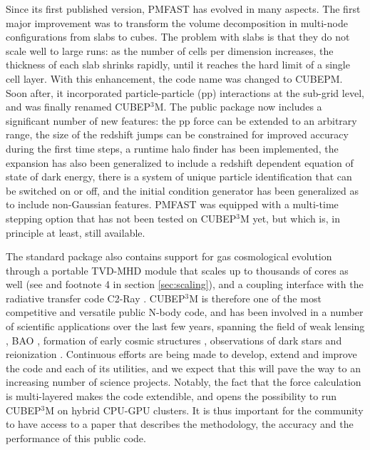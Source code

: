 \documentclass[useAMS,usenatbib]{mn2e}
\begin{document}
Since its first published version, {\small PMFAST} has evolved in many aspects. 
The first major improvement was to transform the volume decomposition in multi-node configurations 
from slabs to cubes. The problem with slabs is that they do not scale well to large runs: 
as the number of cells per dimension increases, the thickness of each slab shrinks rapidly,
until it reaches the hard limit of a single cell layer.  With this enhancement, the code name was changed to {\small CUBEPM}. Soon after, it incorporated particle-particle (pp) interactions at the sub-grid level, 
and was finally renamed {\small CUBEP$^3$M}. The public package now includes a significant number of new features: the pp force
can be extended to an arbitrary range, the size of the redshift jumps can be constrained for improved accuracy during the first time steps,
a runtime halo finder has been implemented, the expansion has also been generalized to include a redshift dependent equation of state of dark energy, there is a system of unique particle identification that can be switched on or off, and the initial condition generator has been generalized as to include non-Gaussian features.
 {\small PMFAST} was equipped with a multi-time stepping option that has not been tested on {\small CUBEP$^3$M} yet, but which is, in principle at least, still available. 
 
 The standard package also contains support for gas cosmological evolution through a portable TVD-MHD module \citep{2003ApJS..149..447P} that scales up to thousands of cores as well (see \citet{2010arXiv1004.1680P} and footnote 4 in section \ref{sec:scaling}), and a coupling interface with the radiative transfer code C2-Ray \citep{2006NewA...11..374M}.
 {\small CUBEP$^3$M} is therefore one of the most competitive and versatile public N-body code, 
 and has been involved in a number of scientific applications over the last few years,
spanning the field of weak lensing \citep{Vafaei10, 2008MNRAS.388.1819L,  2009arXiv0905.0501D, 2010PhRvD..81l3015L, 2010arXiv1012.0444Y, 2012arXiv1202.2332H},  BAO
 \citep{2010arXiv1008.3506Z,  2012MNRAS.419.2949N, 2012MNRAS.423.2288H, 2012arXiv1205.4989H}, 
formation of early cosmic structures \citep{2008arXiv0806.2887I,2010arXiv1005.2502I},
observations of dark stars \citep{2010MNRAS.407L..74Z,2012MNRAS.tmp.2794I} and
reionization \citep{2011arXiv1107.4772I,Fernandez:2011ab,2011MNRAS.413.1353F,2012MNRAS.422..926M,Datta:2011hv,2012arXiv1203.0517F}. 
Continuous efforts are being made to develop, extend and improve the code and each of its utilities, 
and we expect that this will pave the way to an increasing number of science projects. 
Notably, the fact that the force calculation is multi-layered makes the code extendible, 
and opens the possibility to run {\small CUBEP$^3$M} on hybrid CPU-GPU clusters.
It is thus important for the community to have access to a paper that describes the methodology, the accuracy and the performance of this public code. 
\end{document}
